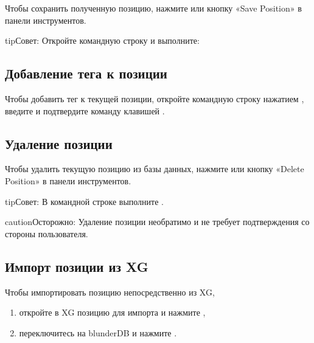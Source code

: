 \documentclass[letterpaper,10pt,russian]{sphinxmanual}
\begin{document}
\sphinxAtStartPar
Чтобы сохранить полученную позицию, нажмите  или кнопку «Save Position» в панели инструментов.

\begin{sphinxadmonition}{tip}{Совет:}
\sphinxAtStartPar
Откройте командную строку и выполните: 
\end{sphinxadmonition}


\subsection{Добавление тега к позиции}
\label{\detokenize{guide_utilisateur:etiqueter-une-position}}
\sphinxAtStartPar
Чтобы добавить тег  к текущей позиции, откройте командную строку нажатием , введите  и подтвердите команду клавишей .


\subsection{Удаление позиции}
\label{\detokenize{guide_utilisateur:supprimer-une-position}}
\sphinxAtStartPar
Чтобы удалить текущую позицию из базы данных, нажмите  или кнопку «Delete Position» в панели инструментов.

\begin{sphinxadmonition}{tip}{Совет:}
\sphinxAtStartPar
В командной строке выполните .
\end{sphinxadmonition}

\begin{sphinxadmonition}{caution}{Осторожно:}
\sphinxAtStartPar
Удаление позиции необратимо и не требует подтверждения со стороны пользователя.
\end{sphinxadmonition}


\subsection{Импорт позиции из XG}
\label{\detokenize{guide_utilisateur:import-une-position-depuis-xg}}
\sphinxAtStartPar
Чтобы импортировать позицию непосредственно из XG,
\begin{enumerate}
%
\item {} 
\sphinxAtStartPar
откройте в XG позицию для импорта и нажмите ,

\item {} 
\sphinxAtStartPar
переключитесь на blunderDB и нажмите .

\end{enumerate}
\end{document}
